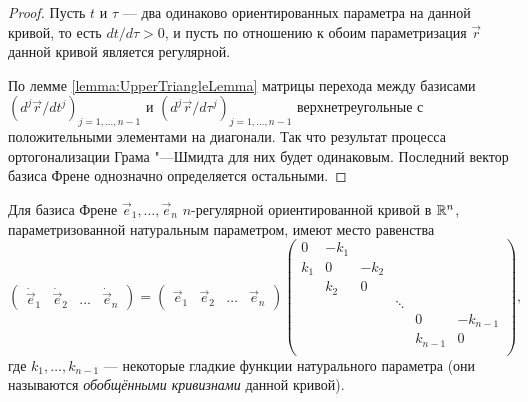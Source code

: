 \begin{proof}
	Пусть $t$ и $\tau$ --- два одинаково ориентированных параметра на данной кривой, то есть $dt / d\tau > 0$, и пусть по отношению к обоим параметризация $\vec{r}$ данной кривой является регулярной.

	По лемме \ref{lemma:UpperTriangleLemma} матрицы перехода между базисами $(d^j\vec{r} / dt^j)_{j = 1, \ldots, {n - 1}}$ и $(d^j\vec{r} / d\tau^j)_{j = 1, \ldots, {n - 1}}$ верхнетреугольные с положительными элементами на диагонали. Так что результат процесса ортогонализации Грама "---Шмидта для них будет одинаковым. Последний вектор базиса Френе однозначно определяется остальными.
\end{proof}

\begin{theorem}
	Для базиса Френе $\vec{e}_1, \ldots, \vec{e}_n$ $n$-регулярной ориентированной кривой в $\mathbb{R}^n$, параметризованной натуральным параметром, имеют место равенства
	\[
		\begin{pmatrix}
			\dot{\vec{e}}_1 & \dot{\vec{e}}_2 & \ldots & \dot{\vec{e}}_n
		\end{pmatrix} =
		\begin{pmatrix}
			\vec{e}_1 & \vec{e}_2 & \ldots & \vec{e}_n
		\end{pmatrix}
		\begin{pmatrix}
			0 & -k_1 & & & & \\
			k_1 & 0 & -k_2 & & & \\
			 & k_2 & 0 & & & \\
			 & & & \ddots & & \\
			 & & & & 0 & -k_{n - 1}\\
			 & & & & k_{n - 1} & 0\\
		\end{pmatrix},
	\]
	где $k_1, \ldots, k_{n - 1}$ --- некоторые гладкие функции натурального параметра (они называются \textit{обобщёнными кривизнами} данной кривой).
\end{theorem}

